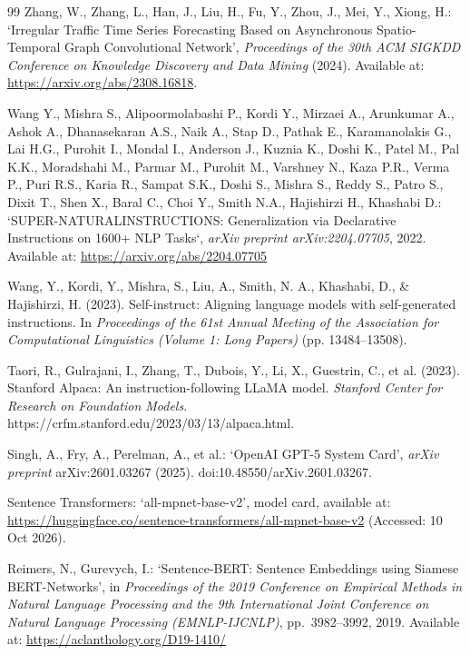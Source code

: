 \documentclass[a4paper,fleqn]{cas-sc}
\begin{document}
\begin{thebibliography}{99}
Zhang, W., Zhang, L., Han, J., Liu, H., Fu, Y.,
Zhou, J., Mei, Y., Xiong, H.:
`Irregular Traffic Time Series Forecasting Based on
Asynchronous Spatio-Temporal Graph Convolutional Network',
\textit{Proceedings of the 30th ACM SIGKDD Conference
on Knowledge Discovery and Data Mining} (2024).
Available at: \url{https://arxiv.org/abs/2308.16818}.

Wang Y., Mishra S., Alipoormolabashi P., Kordi Y., Mirzaei A., Arunkumar A., Ashok A., Dhanasekaran A.S., Naik A., Stap D., Pathak E., Karamanolakis G., Lai H.G., Purohit I., Mondal I., Anderson J., Kuznia K., Doshi K., Patel M., Pal K.K., Moradshahi M., Parmar M., Purohit M., Varshney N., Kaza P.R., Verma P., Puri R.S., Karia R., Sampat S.K., Doshi S., Mishra S., Reddy S., Patro S., Dixit T., Shen X., Baral C., Choi Y., Smith N.A., Hajishirzi H., Khashabi D.:  
`SUPER-NATURALINSTRUCTIONS: Generalization via Declarative Instructions on 1600+ NLP Tasks`, \textit{arXiv preprint arXiv:2204.07705}, 2022. Available at: \url{https://arxiv.org/abs/2204.07705}

Wang, Y., Kordi, Y., Mishra, S., Liu, A., Smith, N. A.,
Khashabi, D., \& Hajishirzi, H. (2023).
Self-instruct: Aligning language models with self-generated instructions.
In \textit{Proceedings of the 61st Annual Meeting of the
Association for Computational Linguistics (Volume 1: Long Papers)}
(pp. 13484--13508).

Taori, R., Gulrajani, I., Zhang, T., Dubois, Y.,
Li, X., Guestrin, C., et al. (2023).
Stanford Alpaca: An instruction-following LLaMA model.
\textit{Stanford Center for Research on Foundation Models}.
https://crfm.stanford.edu/2023/03/13/alpaca.html.

Singh, A., Fry, A., Perelman, A., et al.:
`OpenAI GPT-5 System Card',
\textit{arXiv preprint} arXiv:2601.03267 (2025).
doi:10.48550/arXiv.2601.03267.

Sentence Transformers:
`all-mpnet-base-v2', model card, available at: \url{https://huggingface.co/sentence-transformers/all-mpnet-base-v2} (Accessed: 10 Oct 2026).

Reimers, N., Gurevych, I.:
`Sentence-BERT: Sentence Embeddings using Siamese BERT-Networks', in \textit{Proceedings of the 2019 Conference on Empirical Methods in Natural Language Processing and the 9th International Joint Conference on Natural Language Processing (EMNLP-IJCNLP)}, pp.~3982--3992, 2019. Available at: \url{https://aclanthology.org/D19-1410/}


\end{thebibliography}
\end{document}
